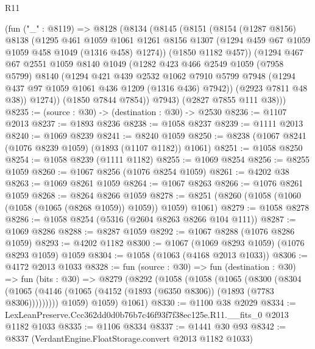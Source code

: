 \begin{lexlean}{R11}
\begin{coremodule}
      (fun ("_" : @8119) =>
      @8128
        (@8134
          (@8145
            (@8151
              (@8154
                (@1287 @8156)
                @8138
                (@1295
                  @461
                  @1059
                  @1061
                  @1261
                  @8156
                  @1307
                  (@1294 @459 @67 @1059 @1059 @458 @1049 (@1316 @458) @1274))
                (@1850 @1182 @457))
              (@1294
                @467
                @67
                @2551
                @1059
                @8140
                @1049
                (@1282
                  @423
                  @466
                  @2549
                  @1059
                  (@7958 @5799)
                  @8140
                  (@1294
                    @421
                    @439
                    @2532
                    @1062
                    @7910
                    @5799
                    @7948
                    (@1294 @437 @97 @1059 @1061 @436 @1209 (@1316 @436) @7942))
                  (@2923 @7811 @48 @38))
                @1274))
            (@1850 @7844 @7854))
          @7943)
        (@2827 @7855 @111 @38)))
@8235 := (source : @30) -> (destination : @30) -> @2530
@8236 := @1107 @2013
@8237 := @1893 @8236
@8238 := @1058 @8237
@8239 := @1111 @2013
@8240 := @1069 @8239
@8241 := @8240 @1059
@8250 := @8238 (@1067 @8241 (@1076 @8239 @1059) (@1893 (@1107 @1182)) @1061)
@8251 := @1058 @8250
@8254 := @1058 @8239 (@1111 @1182)
@8255 := @1069 @8254
@8256 := @8255 @1059
@8260 := @1067 @8256 (@1076 @8254 @1059)
@8261 := @4202 @38
@8263 := @1069 @8261 @1059
@8264 := @1067 @8263
@8266 := @1076 @8261 @1059
@8268 := @8264 @8266 @1059
@8278 := @8251 (@8260 (@1058 (@1060 (@1058 (@1065 (@8268 @1059)) @1059)) @1059) @1061)
@8279 := @1058 @8278
@8286 := @1058 @8254 (@5316 (@2604 @8263 @8266 @104 @111))
@8287 := @1069 @8286
@8288 := @8287 @1059
@8292 := @1067 @8288 (@1076 @8286 @1059)
@8293 := @4202 @1182
@8300 := @1067 (@1069 @8293 @1059) (@1076 @8293 @1059) @1059
@8304 := @1058 (@1063 (@4168 @2013 @1033))
@8306 := @4172 @2013 @1033
@8328 := fun (source : @30) =>
  fun (destination : @30) =>
  fun (bits : @30) =>
  @8279
    (@8292
      (@1058
        (@1058
          (@1065
            (@8300
              (@8304 (@1065 (@4146 (@1065 (@4152 (@1893 (@6350 @8306)) (@1893 (@7783 @8306)))))))))
          @1059)
        @1059)
      @1061)
@8330 := @1100 @38 @2029
@8334 := LexLeanPreserve.Ccc362dd0d0b76b7c46f93f7f38ec125e.R11.__fits_0 @2013 @1182 @1033
@8335 := @1106 @8334
@8337 := @1441 @30 @93
@8342 := @8337 (VerdantEngine.FloatStorage.convert @2013 @1182 @1033)

\end{coremodule}
\end{lexlean}
